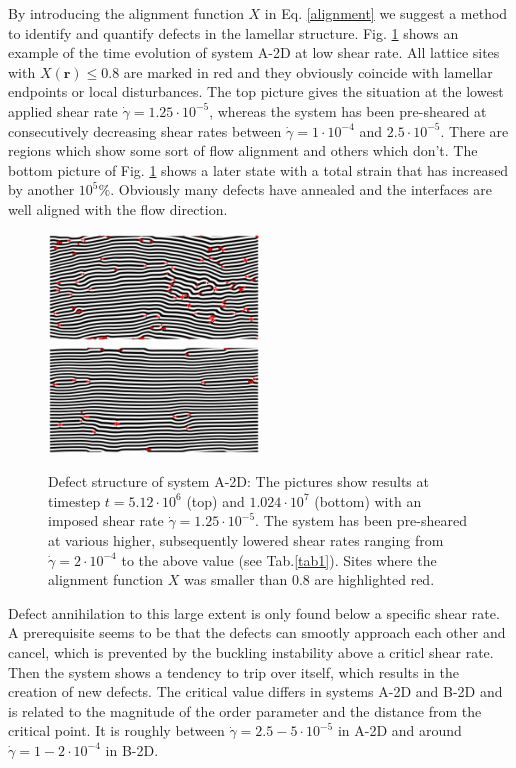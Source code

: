 \documentclass[8.5pt,twoside,twocolumn]{article}
\newcommand{\e}[1]{\cdot10^{#1}}
\newcommand{\gd}{\dot{\gamma}}
\begin{document}
By introducing the alignment function $X$ in Eq. \ref{alignment} we suggest a method to identify and quantify defects in the lamellar structure.
Fig. \ref{fig3} shows an example of the time evolution of system A-2D at low shear rate.
All lattice sites with $X({\mathbf r})\le0.8$ are marked in red and they obviously coincide with lamellar endpoints or local disturbances.
The top picture gives the situation at the lowest applied shear rate $\dot{\gamma}=1.25\e{-5}$, whereas the system has been pre-sheared at consecutively decreasing shear rates between $\gd=1\e{-4}$ and $2.5\e{-5}$.
There are regions which show some sort of flow alignment and others which don't.
The bottom picture of Fig. \ref{fig3} shows a later state with a total strain that has increased by another $10^{5}\%$. 
Obviously many defects have annealed and the interfaces are well aligned with the flow direction.

\begin{figure}[htp]
\centering
\includegraphics[angle=0,width=0.5\textwidth]{phi_defects_run774_5120.jpg}
\includegraphics[angle=0,width=0.5\textwidth]{phi_defects_run774_10240.jpg}
\caption{Defect structure of system A-2D: The pictures show results at timestep $t=5.12\e{6}$ (top) and $1.024\e{7}$ (bottom) with an imposed shear rate $\dot{\gamma}=1.25\cdot10^{-5}$. The system has been pre-sheared at various higher, subsequently lowered shear rates ranging from $\dot{\gamma}=2\e{-4}$ to the above value (see Tab.\ref{tab1}). Sites where the alignment function $X$ was smaller than $0.8$ are highlighted red.}
\label{fig3}
\end{figure}

Defect annihilation to this large extent is only found below a specific shear rate.
A prerequisite seems to be that the defects can smootly approach each other and cancel, which is prevented by the buckling instability above a criticl shear rate.
Then the system shows a tendency to trip over itself, which results in the creation of new defects.
The critical value differs in systems A-2D and B-2D and is related to the magnitude of the order parameter and the distance from the critical point.
It is roughly between $\dot{\gamma}=2.5-5\e{-5}$ in A-2D and around $\dot{\gamma}=1-2\e{-4}$ in B-2D.\\
\end{document}
